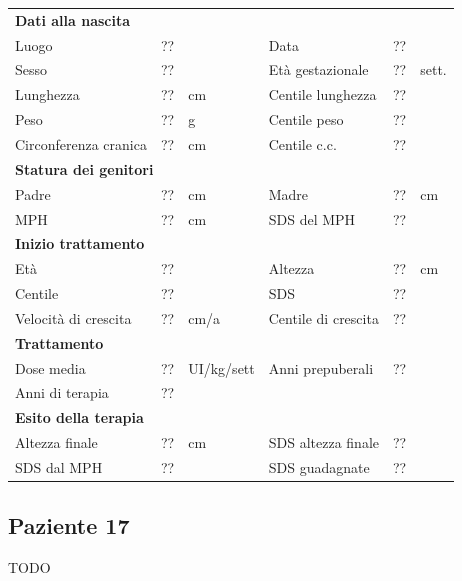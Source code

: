\begin{table}[!h]
\begin{tabular}{lrllrl}
\toprule
\multicolumn{6}{l}{\textbf{Dati alla nascita}}\\
Luogo 		& \multicolumn{2}{l}{??} 	& Data 					& \multicolumn{2}{l}{??} 	\\
Sesso 		& \multicolumn{2}{l}{??} 	& Età gestazionale 		& ?? 		& sett.\\
Lunghezza 	& ?? 		& cm 				& Centile lunghezza		& ?? 		\\
Peso 		& ?? 		& g					& Centile peso			& ?? 		\\
Circonferenza cranica	& ?? 		& cm 	& Centile c.c.			& ?? \\
\midrule
\multicolumn{6}{l}{\textbf{Statura dei genitori}}\\
Padre 		& ?? & cm 	& Madre 				& ?? & cm \\
MPH 		& ?? & cm 	& SDS del MPH 			& ??\\
\midrule
\multicolumn{6}{l}{\textbf{Inizio trattamento}} \\
Età	& ?? & 		& Altezza 				& ?? & cm  \\
Centile & ?? 	 &		& SDS		& ?? \\
Velocità di crescita & ?? & cm/a	& Centile di crescita & ??\\
\midrule
\multicolumn{6}{l}{\textbf{Trattamento}} \\
Dose media		& ?? & UI/kg/sett & Anni prepuberali & ??\\
Anni di terapia & ??\\
\midrule
\multicolumn{6}{l}{\textbf{Esito della terapia}} \\
Altezza finale			& ?? & cm 	& SDS altezza finale		& ??\\
SDS dal MPH				& ?? &		& SDS guadagnate 			& ??\\
\bottomrule
\end{tabular}
\end{table}
\clearpage


\subsection*{Paziente 17}

TODO


